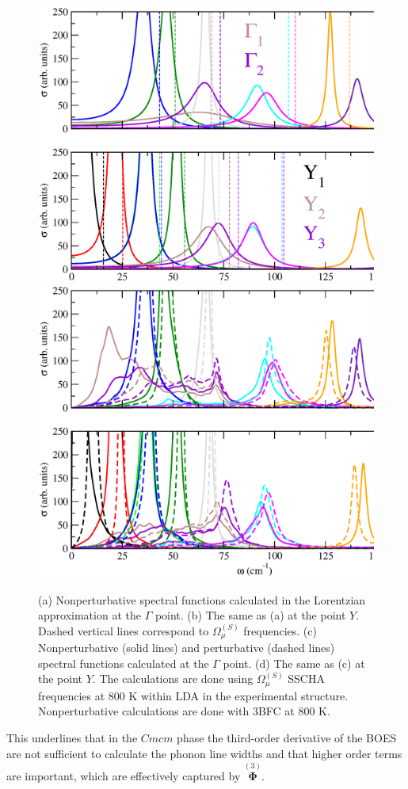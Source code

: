 \begin{figure}[th]
\begin{center}
\includegraphics[width=0.8\linewidth]{Figures/spectrum-lorentzian-snse.eps}
\includegraphics[width=0.8\linewidth]{Figures/spf-p-np-snse.eps}
	\caption[Perturbative and nonperturbative spectral functions in SnSe.]{(a) Nonperturbative spectral functions 
	calculated in the Lorentzian approximation at the $\Gamma$ point. (b) The same as (a) at the point $Y$. 
	Dashed vertical lines correspond to $\Omega^{(S)}_{\mu}$ frequencies. (c) Nonperturbative (solid lines) and 
	perturbative (dashed lines) spectral functions calculated at the $\Gamma$ point. (d) The same as (c) at the 
	point $Y$. The calculations are done using $\Omega^{(S)}_{\mu}$ SSCHA frequencies at $800$ K within LDA in 
	the experimental structure. Nonperturbative calculations are done with 3BFC at $800$ K.}
\label{spf-p-np}
\end{center}
\end{figure}
This underlines that in the $Cmcm$ phase the third-order derivative of the BOES are not sufficient to calculate the phonon line widths and that higher order terms are important, which are effectively 
captured by $\overset{(3)}{\boldsymbol{\Phi}}$. \\


